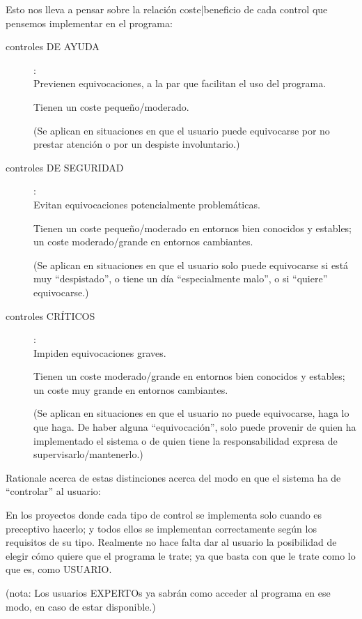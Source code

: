\documentclass[spanish,12pt,a4paper,final,oneside]{book}
\begin{document}
Esto nos lleva a pensar sobre la relación coste|beneficio de cada control que pensemos implementar en el programa:
\begin{description}

\item[controles DE AYUDA]:\\Previenen equivocaciones, a la par que facilitan el uso del programa. 

Tienen un coste pequeño/moderado.

(Se aplican en situaciones en que el usuario puede equivocarse por no prestar atención o por un despiste involuntario.)

\item[controles DE SEGURIDAD]:\\Evitan equivocaciones potencialmente problemáticas. 

Tienen un coste pequeño/moderado en entornos bien conocidos y estables; un coste moderado/grande en entornos cambiantes.

(Se aplican en situaciones en que el usuario solo puede equivocarse si está muy ``despistado'', o tiene un día ``especialmente malo'', o si ``quiere'' equivocarse.)

\item[controles CRÍTICOS]:\\Impiden equivocaciones graves.

Tienen un coste moderado/grande en entornos bien conocidos y estables; un coste muy grande en entornos cambiantes.

(Se aplican en situaciones en que el usuario no puede equivocarse, haga lo que haga. De haber alguna ``equivocación'', solo puede provenir de quien ha implementado el sistema o de quien tiene la responsabilidad expresa de supervisarlo/mantenerlo.)

\end{description}

Rationale acerca de estas distinciones acerca del modo en que el sistema ha de ``controlar'' al usuario:

En los proyectos donde cada tipo de control se implementa solo cuando es preceptivo hacerlo; y todos ellos se implementan correctamente según los requisitos de su tipo. Realmente no hace falta dar al usuario la posibilidad de elegir cómo quiere que el programa le trate; ya que basta con que le trate como lo que es, como USUARIO.

(nota: Los usuarios EXPERTOs ya sabrán como acceder al programa en ese modo, en caso de estar disponible.) 
\end{document}
